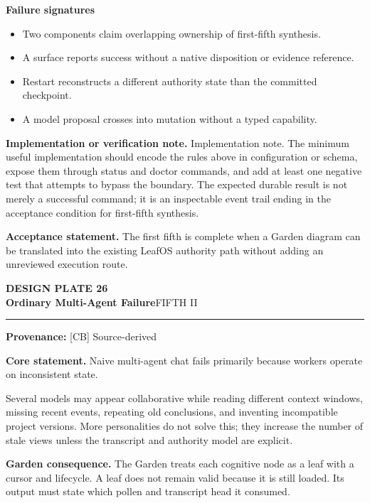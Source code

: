 \documentclass[10pt,letterpaper,oneside]{article}
\newcommand{\prov}[1]{\textcolor{gardenBlue}{\sffamily\footnotesize\textbf{Provenance:} #1}}
\newcommand{\platetitle}[3]{%
  \begin{minipage}[t][0.54in][t]{\textwidth}
  {\sffamily\bfseries\color{gardenDeep}\fontsize{9}{10}\selectfont DESIGN PLATE #1}\\[-1pt]
  {\sffamily\bfseries\color{gardenInk}\fontsize{16.5}{18}\selectfont #2}\hfill{\sffamily\color{gardenGreen}\large #3}
  \end{minipage}\vspace{-2pt}\hrule\vspace{5pt}}
\begin{document}
\textbf{Failure signatures}
\begin{itemize}
\item Two components claim overlapping ownership of first-fifth synthesis.
\item A surface reports success without a native disposition or evidence reference.
\item Restart reconstructs a different authority state than the committed checkpoint.
\item A model proposal crosses into mutation without a typed capability.
\end{itemize}
\textbf{Implementation or verification note.} Implementation note. The minimum useful implementation should encode the rules above in configuration or schema, expose them through status and doctor commands, and add at least one negative test that attempts to bypass the boundary. The expected durable result is not merely a successful command; it is an inspectable event trail ending in the acceptance condition for first-fifth synthesis.

\begin{acceptbox}
\textbf{Acceptance statement.} The first fifth is complete when a Garden diagram can be translated into the existing LeafOS authority path without adding an unreviewed execution route.
\end{acceptbox}
\newpage
\platetitle{26}{Ordinary Multi-Agent Failure}{FIFTH II}
\prov{[CB] Source-derived}
\fontsize{8.85}{10.45}\selectfont
\begin{corebox}
\textbf{Core statement.} Naive multi-agent chat fails primarily because workers operate on inconsistent state.
\end{corebox}
Several models may appear collaborative while reading different context windows, missing recent events, repeating old conclusions, and inventing incompatible project versions. More personalities do not solve this; they increase the number of stale views unless the transcript and authority model are explicit.

\textbf{Garden consequence.} The Garden treats each cognitive node as a leaf with a cursor and lifecycle. A leaf does not remain valid because it is still loaded. Its output must state which pollen and transcript head it consumed.
\end{document}
